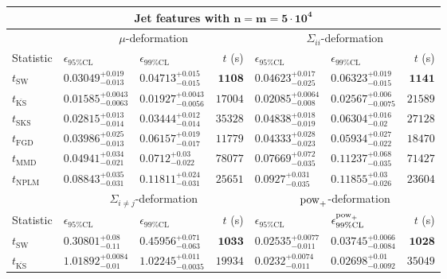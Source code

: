 \begin{tabular}{l|llr|llr}
	\toprule
	\multicolumn{7}{c}{{\bf Jet features with $\mathbf{n=m=5\cdot 10^{4}}$}} \\
	\toprule
	\multicolumn{1}{c}{} & \multicolumn{3}{c}{$\mu$-deformation} & \multicolumn{3}{c}{$\Sigma_{ii}$-deformation} \\
	Statistic & $\epsilon_{95\%\mathrm{CL}}$ & $\epsilon_{99\%\mathrm    {CL}}$ & $t$ (s) & $\epsilon_{95\%\mathrm{CL}}$ & $\epsilon_{99\%\mathrm{CL}}$ & $t$ (s) \\
	\midrule
	$t_{\mathrm{SW}}$ & $0.03049_{-0.013}^{+0.019}$ & $0.04713_{-0.015}^{+0.015}$ & ${\mathbf{1108}}$ & $0.04623_{-0.025}^{+0.017}$ & $0.06323_{-0.015}^{+0.019}$ & ${\mathbf{1141}}$ \\
	$t_{\overline{\mathrm{KS}}}$ & ${\mathbf{0.01585_{-0.0063}^{+0.0043}}}$ & ${\mathbf{0.01927_{-0.0056}^{+0.0043}}}$ & $17004$ & ${\mathbf{0.02085_{-0.008}^{+0.0064}}}$ & ${\mathbf{0.02567_{-0.0075}^{+0.006}}}$ & $21589$ \\
	$t_{\mathrm{SKS}}$ & $0.02815_{-0.014}^{+0.013}$ & $0.03444_{-0.014}^{+0.012}$ & $35328$ & $0.04838_{-0.019}^{+0.018}$ & $0.06304_{-0.02}^{+0.016}$ & $27128$ \\
	$t_{\mathrm{FGD}}$ & $0.03986_{-0.013}^{+0.025}$ & $0.06157_{-0.017}^{+0.019}$ & $11779$ & $0.04333_{-0.023}^{+0.028}$ & $0.05934_{-0.022}^{+0.027}$ & $18470$ \\
	$t_{\mathrm{MMD}}$ & $0.04941_{-0.021}^{+0.034}$ & $0.0712_{-0.022}^{+0.03}$ & $78077$ & $0.07669_{-0.035}^{+0.072}$ & $0.11237_{-0.035}^{+0.068}$ & $71427$ \\
\rowcolor{red!35}	$t_{\mathrm{NPLM}}$ & $0.08843_{-0.031}^{+0.035}$ & $0.11811_{-0.031}^{+0.024}$ & $25651$ & $0.0927_{-0.035}^{+0.031}$ & $0.11855_{-0.026}^{+0.03}$ & $23604$ \\
	\toprule
	\multicolumn{1}{c}{} & \multicolumn{3}{c}{$\Sigma_{i\neq j}$-deformation} & \multicolumn{3}{c}{$\rm{pow}_{+}$-deformation} \\
	Statistic & $\epsilon_{95\%\mathrm{CL}}$ & $\epsilon_{99\%\mathrm{CL}}$ & $t$ (s) & $\epsilon_{95\%\mathrm{CL}}$ & $\epsilon^{\rm   {pow}_{+}}_{99\%\mathrm{CL}}$ & $t$ (s) \\
	\midrule
	$t_{\mathrm{SW}}$ & $0.30801_{-0.11}^{+0.08}$ & $0.45956_{-0.063}^{+0.071}$ & ${\mathbf{1033}}$ & $0.02535_{-0.011}^{+0.0077}$ & $0.03745_{-0.0084}^{+0.0066}$ & ${\mathbf{1028}}$ \\
	$t_{\overline{\mathrm{KS}}}$ & $1.01892_{-0.01}^{+0.0084}$ & $1.02245_{-0.0035}^{+0.011}$ & $19934$ & ${\mathbf{0.0232_{-0.011}^{+0.0074}}}$ & ${\mathbf{0.02698_{-0.0092}^{+0.01}}}$ & $35049$ \\

\end{tabular}
